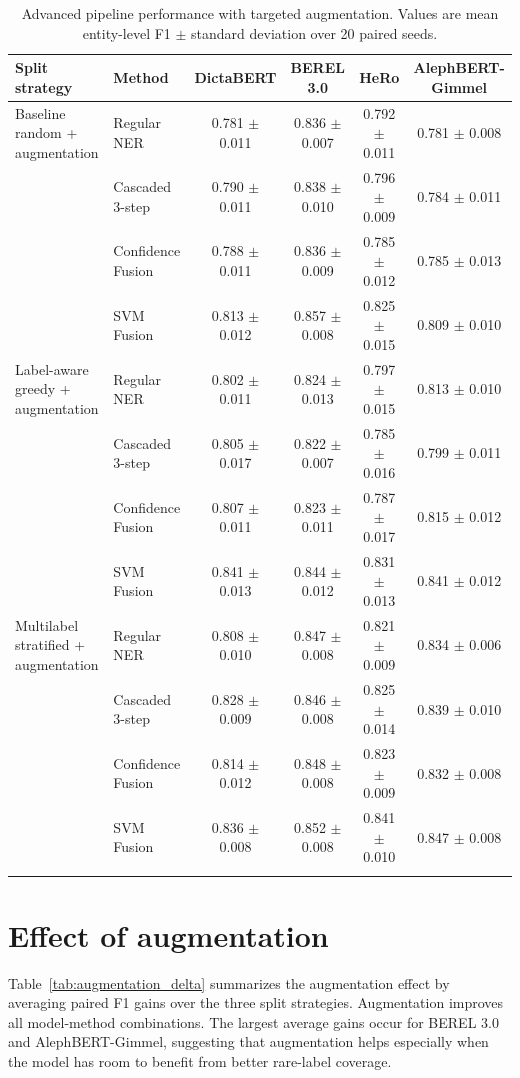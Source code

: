 \documentclass[12pt,a4paper]{report}
\begin{document}
\begin{landscape}
\begin{table}[htbp]
\centering
\scriptsize
\caption{Advanced pipeline performance with targeted augmentation. Values are mean entity-level F1 $\pm$ standard deviation over 20 paired seeds.}
\label{tab:advanced_aug}
\begin{tabular}{llcccc}
\toprule
Split strategy & Method & DictaBERT & BEREL 3.0 & HeRo & AlephBERT-Gimmel \\
\midrule
Baseline random + augmentation & Regular NER & 0.781 $\pm$ 0.011 & 0.836 $\pm$ 0.007 & 0.792 $\pm$ 0.011 & 0.781 $\pm$ 0.008 \\
 & Cascaded 3-step & 0.790 $\pm$ 0.011 & 0.838 $\pm$ 0.010 & 0.796 $\pm$ 0.009 & 0.784 $\pm$ 0.011 \\
 & Confidence Fusion & 0.788 $\pm$ 0.011 & 0.836 $\pm$ 0.009 & 0.785 $\pm$ 0.012 & 0.785 $\pm$ 0.013 \\
 & SVM Fusion & 0.813 $\pm$ 0.012 & 0.857 $\pm$ 0.008 & 0.825 $\pm$ 0.015 & 0.809 $\pm$ 0.010 \\
\addlinespace[2pt]
Label-aware greedy + augmentation & Regular NER & 0.802 $\pm$ 0.011 & 0.824 $\pm$ 0.013 & 0.797 $\pm$ 0.015 & 0.813 $\pm$ 0.010 \\
 & Cascaded 3-step & 0.805 $\pm$ 0.017 & 0.822 $\pm$ 0.007 & 0.785 $\pm$ 0.016 & 0.799 $\pm$ 0.011 \\
 & Confidence Fusion & 0.807 $\pm$ 0.011 & 0.823 $\pm$ 0.011 & 0.787 $\pm$ 0.017 & 0.815 $\pm$ 0.012 \\
 & SVM Fusion & 0.841 $\pm$ 0.013 & 0.844 $\pm$ 0.012 & 0.831 $\pm$ 0.013 & 0.841 $\pm$ 0.012 \\
\addlinespace[2pt]
Multilabel stratified + augmentation & Regular NER & 0.808 $\pm$ 0.010 & 0.847 $\pm$ 0.008 & 0.821 $\pm$ 0.009 & 0.834 $\pm$ 0.006 \\
 & Cascaded 3-step & 0.828 $\pm$ 0.009 & 0.846 $\pm$ 0.008 & 0.825 $\pm$ 0.014 & 0.839 $\pm$ 0.010 \\
 & Confidence Fusion & 0.814 $\pm$ 0.012 & 0.848 $\pm$ 0.008 & 0.823 $\pm$ 0.009 & 0.832 $\pm$ 0.008 \\
 & SVM Fusion & 0.836 $\pm$ 0.008 & 0.852 $\pm$ 0.008 & 0.841 $\pm$ 0.010 & 0.847 $\pm$ 0.008 \\
\addlinespace[2pt]
\bottomrule
\end{tabular}
\end{table}
\end{landscape}

\section{Effect of augmentation}
Table~\ref{tab:augmentation_delta} summarizes the augmentation effect by averaging paired F1 gains over the three split strategies. Augmentation improves all model-method combinations. The largest average gains occur for BEREL 3.0 and AlephBERT-Gimmel, suggesting that augmentation helps especially when the model has room to benefit from better rare-label coverage.
\end{document}
